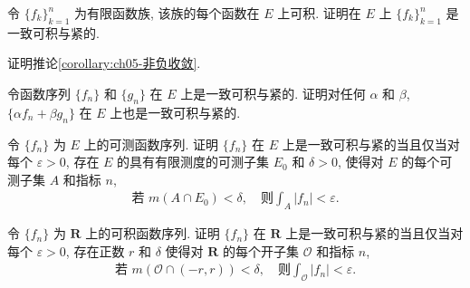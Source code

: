 \documentclass[../../main.tex]{subfiles}
\begin{document}
\begin{exercise}\label{exercise:ch05-01}
令 $\{f_{k}\}_{k=1}^{n}$ 为有限函数族, 该族的每个函数在 $E$ 上可积. 证明在 $E$ 上 $\{f_{k}\}_{k=1}^{n}$ 是一致可积与紧的.
\end{exercise}

\begin{exercise}\label{exercise:ch05-02}
证明推论\cref{corollary:ch05-非负收敛}.
\end{exercise}

\begin{exercise}\label{exercise:ch05-03}
令函数序列 $\{f_{n}\}$ 和 $\{g_{n}\}$ 在 $E$ 上是一致可积与紧的. 证明对任何 $\alpha$ 和 $\beta$, $\{\alpha f_{n}+\beta g_{n}\}$ 在 $E$ 上也是一致可积与紧的.
\end{exercise}

\begin{exercise}\label{exercise:ch05-04}
令 $\{f_{n}\}$ 为 $E$ 上的可测函数序列. 证明 $\{f_{n}\}$ 在 $E$ 上是一致可积与紧的当且仅当对每个 $\varepsilon>0$, 存在 $E$ 的具有有限测度的可测子集 $E_{0}$ 和 $\delta>0$, 使得对 $E$ 的每个可测子集 $A$ 和指标 $n$,
\begin{align*}
\text{若 }m(A\cap E_{0})<\delta,\quad\text{则}\int_{A}|f_{n}|<\varepsilon.
\end{align*}
\end{exercise}

\begin{exercise}\label{exercise:ch05-05}
令 $\{f_{n}\}$ 为 $\mathbf{R}$ 上的可积函数序列. 证明 $\{f_{n}\}$ 在 $\mathbf{R}$ 上是一致可积与紧的当且仅当对每个 $\varepsilon>0$, 存在正数 $r$ 和 $\delta$ 使得对 $\mathbf{R}$ 的每个开子集 $\mathcal{O}$ 和指标 $n$,
\begin{align*}
\text{若 }m(\mathcal{O}\cap(-r,r))<\delta,\quad\text{则}\int_{\mathcal{O}}|f_{n}|<\varepsilon.
\end{align*}
\end{exercise}
\end{document}
